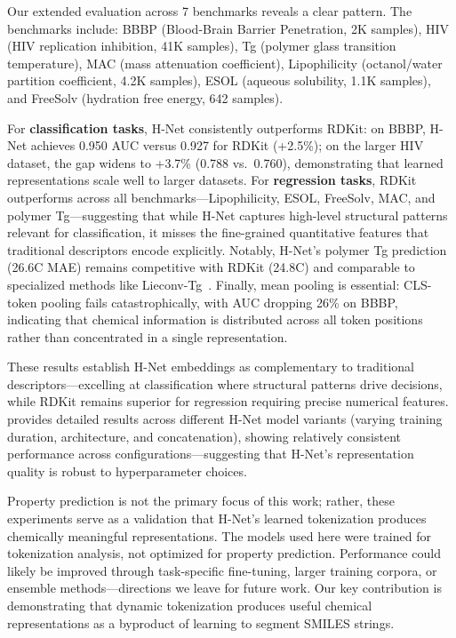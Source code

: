 \documentclass{article}
\newcommand{\hnet}{H-Net}
\begin{document}
Our extended evaluation across 7 benchmarks reveals a clear pattern. The benchmarks include: BBBP (Blood-Brain Barrier Penetration, 2K samples), HIV (HIV replication inhibition, 41K samples), Tg (polymer glass transition temperature), MAC (mass attenuation coefficient), Lipophilicity (octanol/water partition coefficient, 4.2K samples), ESOL (aqueous solubility, 1.1K samples), and FreeSolv (hydration free energy, 642 samples).

For \textbf{classification tasks}, \hnet{} consistently outperforms RDKit: on BBBP, \hnet{} achieves 0.950 AUC versus 0.927 for RDKit (+2.5\%); on the larger HIV dataset, the gap widens to +3.7\% (0.788 vs.\ 0.760), demonstrating that learned representations scale well to larger datasets. For \textbf{regression tasks}, RDKit outperforms across all benchmarks---Lipophilicity, ESOL, FreeSolv, MAC, and polymer Tg---suggesting that while \hnet{} captures high-level structural patterns relevant for classification, it misses the fine-grained quantitative features that traditional descriptors encode explicitly. Notably, \hnet{}'s polymer Tg prediction (26.6\textdegree{}C MAE) remains competitive with RDKit (24.8\textdegree{}C) and comparable to specialized methods like Lieconv-Tg~\citep{zhang2023lieconv}. Finally, mean pooling is essential: CLS-token pooling fails catastrophically, with AUC dropping 26\% on BBBP, indicating that chemical information is distributed across all token positions rather than concentrated in a single representation.

These results establish \hnet{} embeddings as complementary to traditional descriptors---excelling at classification where structural patterns drive decisions, while RDKit remains superior for regression requiring precise numerical features.  provides detailed results across different \hnet{} model variants (varying training duration, architecture, and concatenation), showing relatively consistent performance across configurations---suggesting that \hnet{}'s representation quality is robust to hyperparameter choices.

Property prediction is not the primary focus of this work; rather, these experiments serve as a validation that \hnet{}'s learned tokenization produces chemically meaningful representations. The models used here were trained for tokenization analysis, not optimized for property prediction. Performance could likely be improved through task-specific fine-tuning, larger training corpora, or ensemble methods---directions we leave for future work. Our key contribution is demonstrating that dynamic tokenization produces useful chemical representations as a byproduct of learning to segment SMILES strings.
\end{document}

